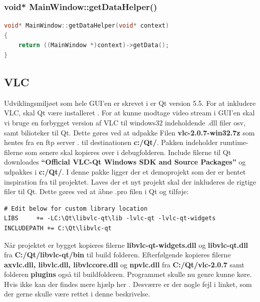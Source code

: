 \subsubsection{void* MainWindow::getDataHelper()}

\begin{lstlisting}[caption={getDataHelper},label=lst:getData, language=c++]
void* MainWindow::getDataHelper(void* context)
{
    return ((MainWindow *)context)->getData();
}
\end{lstlisting}

\subsection{VLC}
Udviklingsmiljøet som hele GUI'en er skrevet i er Qt version 5.5. For at inkludere VLC, skal Qt være installeret \cite{lib:qt}. For at kunne modtage video stream i GUI'en skal vi bruge en forbygget version af VLC til windows32 indeholdende .dll filer osv, samt bilioteker til Qt. Dette gøres ved at udpakke Filen \textbf{vlc-2.0.7-win32.7z} som hentes fra en ftp server \cite{lib:vlc-ftp}. til destinationen \textbf{c:/Qt/}. Pakken indeholder rumtime-filerne som senere skal kopieres over i debugfolderen. Include filerne til Qt downloades \textbf{“Official VLC-Qt Windows SDK and Source Packages”} \cite{lib:vlc-qt} og udpakkes i \textbf{c:/Qt/}. I denne pakke ligger der et demoprojekt som der er hentet inspiration fra til projektet. Laves der et nyt projekt skal der inkluderes de rigtige filer til Qt. Dette gøres ved at åbne .pro filen i Qt og tilføje:

\begin{lstlisting}
# Edit below for custom library location
LIBS     += -LC:\Qt\libvlc-qt\lib -lvlc-qt -lvlc-qt-widgets
INCLUDEPATH += C:\Qt\libvlc-qt
\end{lstlisting}
Når projektet er bygget kopieres filerne \textbf{libvlc-qt-widgets.dll} og \textbf{libvlc-qt.dll} fra \textbf{C:/Qt/libvlc-qt/bin} til build folderen. Efterfølgende kopieres filerne \textbf{axvlc.dll, libvlc.dll, libvlccore.dll} og \textbf{npvlc.dll} fra \textbf{C:/Qt/vlc-2.0.7} samt folderen \textbf{plugins} også til buildfolderen. Programmet skulle nu genre kunne køre. Hvis ikke kan der findes mere hjælp her \cite{lib:vlc-using-qt}. Desværre er der nogle fejl i linket, som der gerne skulle være rettet i denne beskrivelse. 